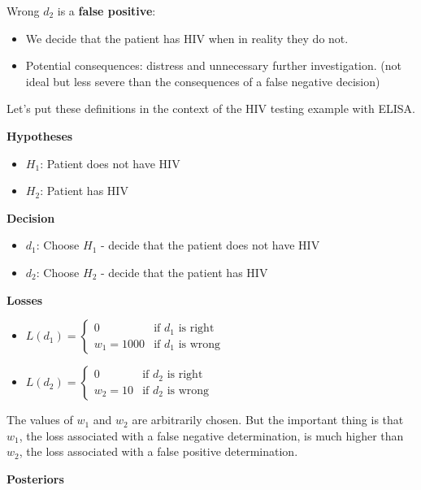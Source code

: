 \documentclass[]{book}
\providecommand{\tightlist}{%
  \setlength{\itemsep}{0pt}\setlength{\parskip}{0pt}}
\theoremstyle{definition}
\theoremstyle{definition}
\theoremstyle{definition}
\theoremstyle{remark}
\begin{document}
Wrong \(d_2\) is a \textbf{false positive}:

\begin{itemize}
\tightlist
\item
  We decide that the patient has HIV when in reality they do not.
\item
  Potential consequences: distress and unnecessary further
  investigation. (not ideal but less severe than the consequences of a
  false negative decision)
\end{itemize}

Let's put these definitions in the context of the HIV testing example
with ELISA.

\textbf{Hypotheses}

\begin{itemize}
\tightlist
\item
  \(H_1\): Patient does not have HIV
\item
  \(H_2\): Patient has HIV
\end{itemize}

\textbf{Decision}

\begin{itemize}
\tightlist
\item
  \(d_1\): Choose \(H_1\) - decide that the patient does not have HIV
\item
  \(d_2\): Choose \(H_2\) - decide that the patient has HIV
\end{itemize}

\textbf{Losses}

\begin{itemize}
\item
  \(L(d_1) = \left\{ \begin{array}{cc} 0 & \text{if $d_1$ is right}\\ w_1=1000 & \text{if $d_1$ is wrong} \end{array}\right.\)
\item
  \(L(d_2) = \left\{ \begin{array}{cc} 0 & \text{if $d_2$ is right}\\ w_2=10 & \text{if $d_2$ is wrong} \end{array}\right.\)
\end{itemize}

The values of \(w_1\) and \(w_2\) are arbitrarily chosen. But the
important thing is that \(w_1\), the loss associated with a false
negative determination, is much higher than \(w_2\), the loss associated
with a false positive determination.

\textbf{Posteriors}
\end{document}
